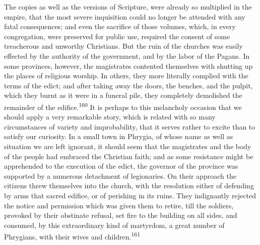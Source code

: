 


The copies as well as the versions of Scripture, were already so
multiplied in the empire, that the most severe inquisition could
no longer be attended with any fatal consequences; and even the
sacrifice of those volumes, which, in every congregation, were
preserved for public use, required the consent of some
treacherous and unworthy Christians. But the ruin of the churches
was easily effected by the authority of the government, and by
the labor of the Pagans. In some provinces, however, the
magistrates contented themselves with shutting up the places of
religious worship. In others, they more literally complied with
the terms of the edict; and after taking away the doors, the
benches, and the pulpit, which they burnt as it were in a funeral
pile, they completely demolished the remainder of the edifice.\textsuperscript{160}
It is perhaps to this melancholy occasion that we should
apply a very remarkable story, which is related with so many
circumstances of variety and improbability, that it serves rather
to excite than to satisfy our curiosity. In a small town in
Phrygia, of whose name as well as situation we are left ignorant,
it should seem that the magistrates and the body of the people
had embraced the Christian faith; and as some resistance might be
apprehended to the execution of the edict, the governor of the
province was supported by a numerous detachment of legionaries.
On their approach the citizens threw themselves into the church,
with the resolution either of defending by arms that sacred
edifice, or of perishing in its ruins. They indignantly rejected
the notice and permission which was given them to retire, till
the soldiers, provoked by their obstinate refusal, set fire to
the building on all sides, and consumed, by this extraordinary
kind of martyrdom, a great number of Phrygians, with their wives
and children.\textsuperscript{161}


